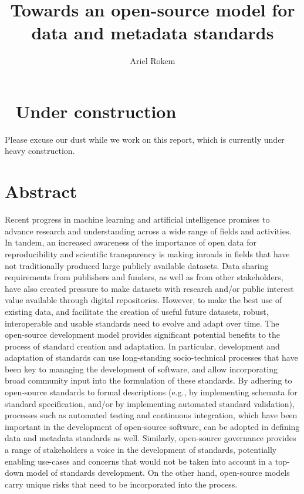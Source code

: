 \documentclass[
  letterpaper,
  DIV=11,
  numbers=noendperiod]{scrartcl}
\title{Towards an open-source model for data and metadata standards}
\author{Ariel Rokem}
\date{}
\begin{document}
\maketitle

\section{🚧 Under construction 🚧}\label{under-construction}

Please excuse our dust while we work on this report, which is currently
under heavy construction.

\section{Abstract}\label{abstract}

Recent progress in machine learning and artificial intelligence promises
to advance research and understanding across a wide range of fields and
activities. In tandem, an increased awareness of the importance of open
data for reproducibility and scientific transparency is making inroads
in fields that have not traditionally produced large publicly available
datasets. Data sharing requirements from publishers and funders, as well
as from other stakeholders, have also created pressure to make datasets
with research and/or public interest value available through digital
repositories. However, to make the best use of existing data, and
facilitate the creation of useful future datasets, robust, interoperable
and usable standards need to evolve and adapt over time. The open-source
development model provides significant potential benefits to the process
of standard creation and adaptation. In particular, development and
adaptation of standards can use long-standing socio-technical processes
that have been key to managing the development of software, and allow
incorporating broad community input into the formulation of these
standards. By adhering to open-source standards to formal descriptions
(e.g., by implementing schemata for standard specification, and/or by
implementing automated standard validation), processes such as automated
testing and continuous integration, which have been important in the
development of open-source software, can be adopted in defining data and
metadata standards as well. Similarly, open-source governance provides a
range of stakeholders a voice in the development of standards,
potentially enabling use-cases and concerns that would not be taken into
account in a top-down model of standards development. On the other hand,
open-source models carry unique risks that need to be incorporated into
the process.
\end{document}
